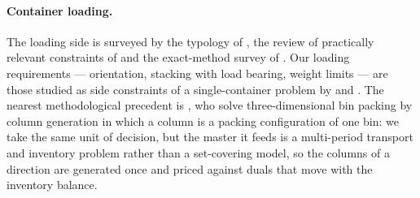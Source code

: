 \paragraph{Container loading.}
The loading side is surveyed by the typology of
\autocite{Wascher2007AnProblems}, the review of practically relevant
constraints of \autocite{Bortfeldt2013ConstraintsReview} and the
exact-method survey of \autocite{Silva2019ExactProblems}. Our loading
requirements --- orientation, stacking with load bearing, weight limits
--- are those studied as side constraints of a single-container problem
by \autocite{Junqueira2012Three-dimensionalConstraints} and
\autocite{Alonso2020AConstraints}. The nearest methodological
precedent is \autocite{Mahvash2018}, who solve three-dimensional bin
packing by column generation in which a column is a packing
configuration of one bin: we take the same unit of decision, but the
master it feeds is a multi-period transport and inventory problem
rather than a set-covering model, so the columns of a direction are
generated once and priced against duals that move with the inventory
balance.


